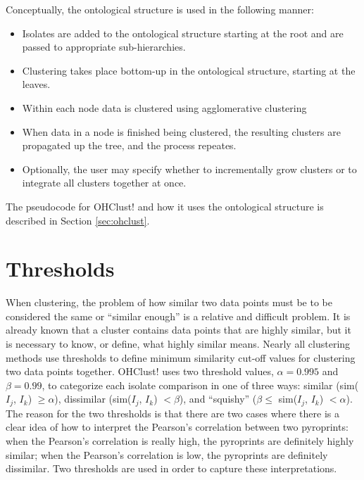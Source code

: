 \documentclass[12pt]{ucthesis}
\begin{document}
      Conceptually, the ontological structure is used in the following manner:
      \begin{itemize}
         \item Isolates are added to the ontological structure starting at the
               root and are passed to appropriate sub-hierarchies.
         \item Clustering takes place bottom-up in the ontological structure,
               starting at the leaves.
         \item Within each node data is clustered using \textsf{agglomerative
               clustering}
         \item When data in a node is finished being clustered, the resulting
               clusters are propagated up the tree, and the process repeates.
         \item Optionally, the user may specify whether to incrementally grow
               clusters or to integrate all clusters together at once.
      \end{itemize}
      The pseudocode for \textsf{OHClust!} and how it uses the ontological structure is
      described in Section \ref{sec:ohclust}.

   \section{Thresholds}
      When clustering, the problem of how similar two data points must be to be
      considered the same or ``similar enough'' is a relative and difficult
      problem. It is already known that a cluster contains data points that are
      highly similar, but it is necessary to know, or define, what highly
      similar means. Nearly all clustering methods use thresholds to define
      minimum similarity cut-off values for clustering two data points
      together. \textsf{OHClust!} uses two threshold values, $\alpha = 0.995$ and
      $\beta = 0.99$, to categorize each isolate comparison in one of three
      ways: similar (sim($I_j$, $I_k$) $\ge \alpha$), dissimilar (sim($I_j$,
      $I_k$) $< \beta$), and ``squishy'' ($\beta \le$ sim($I_j$, $I_k$) $<
      \alpha$). The reason for the two thresholds is that there are two cases
      where there is a clear idea of how to interpret the Pearson's correlation
      between two pyroprints: when the Pearson's correlation is really high,
      the pyroprints are definitely highly similar; when the Pearson's
      correlation is low, the pyroprints are definitely dissimilar. Two
      thresholds are used in order to capture these interpretations.
\end{document}

